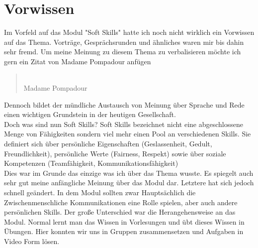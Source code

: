 \chapter{Vorwissen}

Im Vorfeld auf das Modul "Soft Skills" hatte ich noch nicht wirklich ein Vorwissen auf das Thema. Vorträge, Gesprächsrunden und ähnliches waren mir bis dahin sehr fremd. Um meine Meinung zu diesem Thema zu verbalisieren möchte ich gern ein Zitat von Madame Pompadour anfügen

\begin{quote}
	 \dq\\
     Madame Pompadour
\end{quote}

Dennoch bildet der mündliche Austausch von Meinung über Sprache und Rede einen wichtigen Grundstein in der heutigen Gesellschaft.  \\

Doch was sind nun Soft Skills? 
Soft Skills bezeichnet nicht eine abgeschlossene Menge von Fähigkeiten sondern viel mehr einen Pool an verschiedenen Skills. Sie definiert sich über persönliche Eigenschaften (Geslassenheit, Gedult, Freundlichkeit), persönliche Werte (Fairness, Respekt) sowie über soziale Kompetenzen (Teamfähigkeit, Kommunikationsfähigkeit)  ~\cite{SoSk} \\

Dies war im Grunde das einzige was ich über das Thema wusste. Es spiegelt auch sehr gut meine anfängliche Meinung über das Modul dar. Letztere hat sich jedoch schnell geändert. In dem Modul sollten zwar Hauptsächlich die Zwischenmenschliche Kommunikationen eine Rolle spielen, aber auch andere persönlichen Skills.
Der große Unterschied war die Herangehensweise an das Modul. Normal lernt man das Wissen in Vorlesungen und übt dieses Wissen in Übungen. Hier konnten wir uns in Gruppen zusammensetzen und Aufgaben in Video Form lösen. 